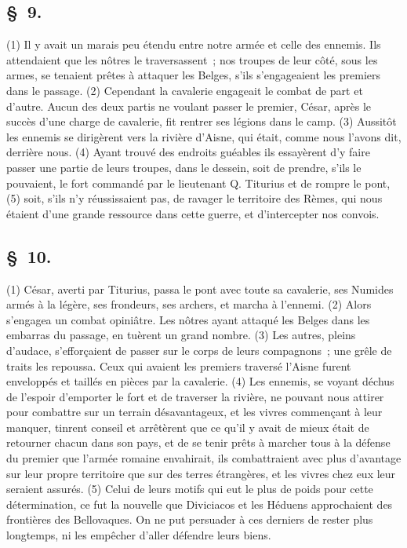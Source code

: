 \documentclass[french,twoside]{book} %
\begin{document}
\subsection[{§ 9.}]{ \textsc{§ 9.} }
\noindent (1) Il y avait un marais peu étendu entre notre armée et celle des ennemis. Ils attendaient que les nôtres le traversassent ; nos troupes de leur côté, sous les armes, se tenaient prêtes à attaquer les Belges, s’ils s’engageaient les premiers dans le passage. (2) Cependant la cavalerie engageait le combat de part et d’autre. Aucun des deux partis ne voulant passer le premier, César, après le succès d’une charge de cavalerie, fit rentrer ses légions dans le camp. (3) Aussitôt les ennemis se dirigèrent vers la rivière d’Aisne, qui était, comme nous l’avons dit, derrière nous. (4) Ayant trouvé des endroits guéables ils essayèrent d’y faire passer une partie de leurs troupes, dans le dessein, soit de prendre, s’ils le pouvaient, le fort commandé par le lieutenant Q. Titurius et de rompre le pont, (5) soit, s’ils n’y réussissaient pas, de ravager le territoire des Rèmes, qui nous étaient d’une grande ressource dans cette guerre, et d’intercepter nos convois.
\subsection[{§ 10.}]{ \textsc{§ 10.} }
\noindent (1) César, averti par Titurius, passa le pont avec toute sa cavalerie, ses Numides armés à la légère, ses frondeurs, ses archers, et marcha à l’ennemi. (2) Alors s’engagea un combat opiniâtre. Les nôtres ayant attaqué les Belges dans les embarras du passage, en tuèrent un grand nombre. (3) Les autres, pleins d’audace, s’efforçaient de passer sur le corps de leurs compagnons ; une grêle de traits les repoussa. Ceux qui avaient les premiers traversé l’Aisne furent enveloppés et taillés en pièces par la cavalerie. (4) Les ennemis, se voyant déchus de l’espoir d’emporter le fort et de traverser la rivière, ne pouvant nous attirer pour combattre sur un terrain désavantageux, et les vivres commençant à leur manquer, tinrent conseil et arrêtèrent que ce qu’il y avait de mieux était de retourner chacun dans son pays, et de se tenir prêts à marcher tous à la défense du premier que l’armée romaine envahirait, ils combattraient avec plus d’avantage sur leur propre territoire que sur des terres étrangères, et les vivres chez eux leur seraient assurés. (5) Celui de leurs motifs qui eut le plus de poids pour cette détermination, ce fut la nouvelle que Diviciacos et les Héduens approchaient des frontières des Bellovaques. On ne put persuader à ces derniers de rester plus longtemps, ni les empêcher d’aller défendre leurs biens.
\end{document}
